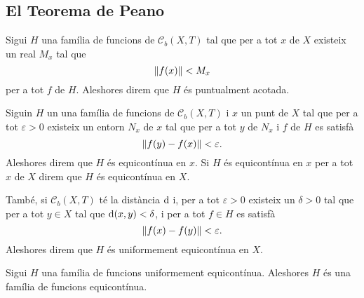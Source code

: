 \documentclass[../Apunts.tex]{subfiles}
\begin{document}
	\subsection{El Teorema de Peano}
	\begin{definition}
		\label{def:família de funcions puntualment acotada}
		Sigui \(H\) una família de funcions de \(\mathcal{C}_{b}(X,T)\) tal que per a tot \(x\) de \(X\) existeix un real \(M_{x}\) tal que
		\[\norm{f(x)}<M_{x}\]
		per a tot \(f\) de \(H\). Aleshores direm que \(H\) és puntualment acotada.
	\end{definition}
	\begin{definition}
		\label{def:família de funcions equicontínua en un punt}
		\label{def:família de funcions equicontínua}
		\label{def:família de funcions uniformement equicontínua}
		Siguin \(H\) un una família de funcions de \(\mathcal{C}_{b}(X,T)\) i \(x\) un punt de \(X\) tal que per a tot \(\varepsilon>0\) existeix un entorn \(N_{x}\) de \(x\) tal que per a tot \(y\) de \(N_{x}\) i \(f\) de \(H\) es satisfà
		\[\norm{f(y)-f(x)}<\varepsilon.\]
		Aleshores direm que \(H\) és equicontínua en \(x\). Si \(H\) és equicontínua en \(x\) per a tot \(x\) de \(X\) direm que \(H\) és equicontínua en \(X\).
		
		També, si \(\mathcal{C}_{b}(X,T)\) té la distància \(\operatorname{d}\) i, per a tot \(\varepsilon>0\) existeix un \(\delta>0\) tal que per a tot \(y\in X\) tal que \(\operatorname{d}(x,y)<\delta\), i per a tot \(f\in H\) es satisfà
		\[\norm{f(x)-f(y)}<\varepsilon.\]
		Aleshores direm que \(H\) és uniformement equicontínua en \(X\).
	\end{definition}
	\begin{observation}
		\label{obs:equicontinuitat uniforme implica equicontinuitat}
		Sigui \(H\) una família de funcions uniformement equicontínua. Aleshores \(H\) és una família de funcions equicontínua.
	\end{observation}
\end{document}
